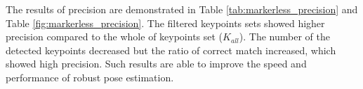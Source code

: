 
The results of precision are demonstrated in Table \ref{tab:markerless_precision} and Table \ref{fig:markerless_precision}. The filtered keypoints sets showed higher precision compared to the whole of keypoints set ($K_{all}$). The number of the detected keypoints decreased but the ratio of correct match increased, which showed high precision. Such results are able to improve the speed and performance of robust pose estimation.  
